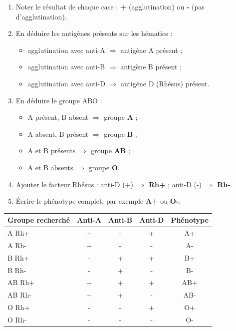\documentclass[11pt]{article}
\begin{document}
\begin{methode}
\begin{enumerate}
    \item Noter le résultat de chaque case : \textbf{+} (agglutination) ou \textbf{-} (pas d'agglutination).
    \item En déduire les antigènes présents sur les hématies :
    \begin{itemize}
        \item agglutination avec anti-A $\Rightarrow$ antigène A présent ;
        \item agglutination avec anti-B $\Rightarrow$ antigène B présent ;
        \item agglutination avec anti-D $\Rightarrow$ antigène D (Rhésus) présent.
    \end{itemize}
    \item En déduire le groupe ABO :
    \begin{itemize}
        \item A présent, B absent $\Rightarrow$ groupe \textbf{A} ;
        \item A absent, B présent $\Rightarrow$ groupe \textbf{B} ;
        \item A et B présents $\Rightarrow$ groupe \textbf{AB} ;
        \item A et B absents $\Rightarrow$ groupe \textbf{O}.
    \end{itemize}
    \item Ajouter le facteur Rhésus : anti-D (+) $\Rightarrow$ \textbf{Rh+} ; anti-D (-) $\Rightarrow$ \textbf{Rh-}.
    \item Écrire le phénotype complet, par exemple \textbf{A+} ou \textbf{O-}.
\end{enumerate}
\end{methode}

\begin{center}
\begin{tabularx}{\linewidth}{|X|c|c|c|c|}\hline
\rowcolor{popblueL}
\textbf{Groupe recherché} & \textbf{Anti-A} & \textbf{Anti-B} & \textbf{Anti-D} & \textbf{Phénotype} \\ \hline
A Rh+ & + & - & + & A+ \\ \hline
A Rh- & + & - & - & A- \\ \hline
B Rh+ & - & + & + & B+ \\ \hline
B Rh- & - & + & - & B- \\ \hline
AB Rh+ & + & + & + & AB+ \\ \hline
AB Rh- & + & + & - & AB- \\ \hline
O Rh+ & - & - & + & O+ \\ \hline
O Rh- & - & - & - & O- \\ \hline
\end{tabularx}
\end{center}
\end{document}
